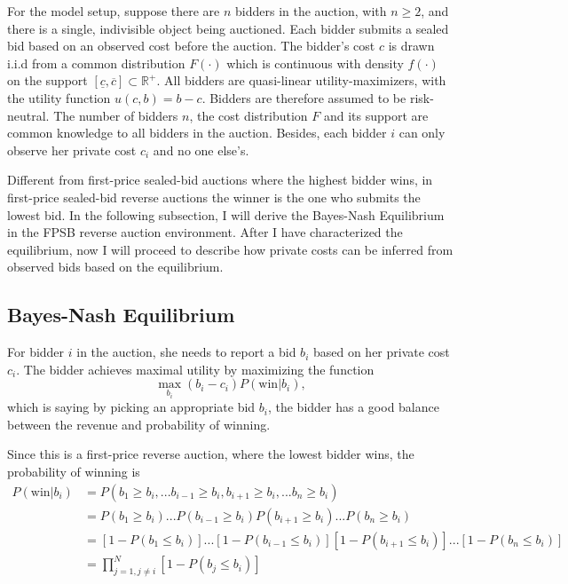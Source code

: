 \documentclass[11pt]{article}
\begin{document}
For the model setup, suppose there are $n$ bidders in the auction, with 
$n \geq 2$, and 
there is a single, indivisible object being auctioned. Each bidder submits 
a sealed bid based on an observed cost before the auction. The 
bidder's cost $c$ is drawn i.i.d from a common distribution $F(\cdot)$ which is 
continuous with density $f(\cdot)$ on the support $[\underline{c}, \overline{c}] \subset \mathbb{R}^{+}$. 
All bidders are quasi-linear utility-maximizers, with the utility function 
$u(c, b) = b - c$. Bidders are therefore assumed to be risk-neutral. 
The number of bidders $n$, the cost distribution $F$ and its support are common 
knowledge to all bidders in the auction. Besides, each bidder $i$ can only observe her 
private cost $c_i$ and no one else's. 

Different from first-price sealed-bid auctions where 
the highest bidder wins, in first-price sealed-bid reverse 
auctions the winner is the one who submits the 
lowest bid. In the following subsection, I will derive the 
Bayes-Nash Equilibrium in the FPSB reverse auction environment.
After I have characterized the equilibrium, now I will proceed to describe how 
private costs can be inferred from observed bids based on the equilibrium. 

\subsection{Bayes-Nash Equilibrium}
For bidder $i$ in the auction, she needs to report a bid $b_i$ based on 
her private cost $c_i$. The bidder achieves maximal utility 
by maximizing the function 
$$ \max_{b_i} (b_i - c_i)P(\text{win}|b_i), $$ 
which is saying by picking an appropriate bid $b_i$, the bidder 
has a good balance between the revenue and probability of winning. 

Since this is a first-price reverse auction, where the lowest bidder wins, 
the probability of winning is 
\begin{align*}
    P(\text{win}|b_i) &= P(b_1 \geq b_i, ... b_{i-1} \geq b_i, b_{i+1} \geq b_i, ... b_n \geq b_i) \\
        &= P(b_1 \geq b_i) ... P(b_{i-1} \geq b_i) P(b_{i+1} \geq b_i) ... P(b_n \geq b_i) \\
        &= [1-P(b_1 \leq b_i)] ... [1-P(b_{i-1} \leq b_i)][1-P(b_{i+1} \leq b_i)] ... [1-P(b_n \leq b_i)] \\
        &= \prod_{j=1, j \neq i}^{N}[1-P(b_j \leq b_i)]
\end{align*}
\end{document}
